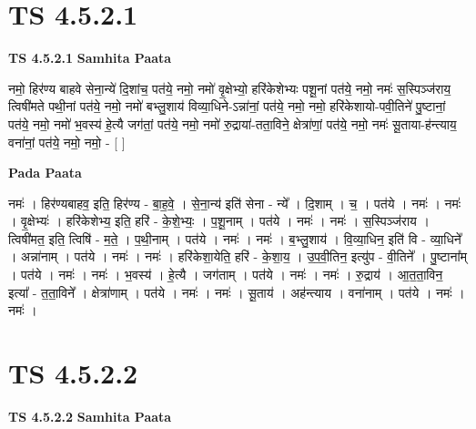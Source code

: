 \documentclass[17pt]{extarticle}
\begin{document}

\section{ TS 4.5.2.1 }

\textbf{TS 4.5.2.1 } \newline
\textbf{Samhita Paata} \newline

नमो॒ हिर॑ण्य बाहवे सेना॒न्ये॑ दि॒शांच॒ पत॑ये॒ नमो॒                        नमो॑ वृ॒क्षेभ्यो॒ हरि॑केशेभ्यः पशू॒नां पत॑ये॒ नमो॒                नमः॑ स॒स्पिञ्ज॑राय॒ त्विषी॑मते पथी॒नां पत॑ये॒ नमो॒                    नमो॑ बभ्लु॒शाय॑ विव्या॒धिने-ऽन्ना॑नां॒ पत॑ये॒ नमो॒                  नमो॒ हरि॑केशायो-पवी॒तिने॑ पु॒ष्टानां॒ पत॑ये॒ नमो॒                                 नमो॑ भ॒वस्य॑ हे॒त्यै जग॑तां॒ पत॑ये॒ नमो॒                                                नमो॑ रु॒द्राया॑-तता॒विने॒ क्षेत्रा॑णां॒ पत॑ये॒ नमो॒                          नमः॑ सू॒ताया-ह॑न्त्याय॒ वना॑नां॒ पत॑ये॒ नमो॒ नमो॒ - [  ] \newline

\textbf{Pada Paata} \newline

नमः॑ । हिर॑ण्यबाहव॒ इति॒ हिर॑ण्य - बा॒ह॒वे॒ । से॒ना॒न्य॑ इति॑ सेना - न्ये᳚ । दि॒शाम् । च॒ । पत॑ये । नमः॑ । नमः॑ । वृ॒क्षेभ्यः॑ । हरि॑केशेभ्य॒ इति॒ हरि॑ - के॒शे॒भ्यः॒ । प॒शू॒नाम् । पत॑ये । नमः॑ । नमः॑ । स॒स्पिञ्ज॑राय । त्विषी॑मत॒ इति॒ त्विषि॑ - म॒ते॒ । प॒थी॒नाम् । पत॑ये । नमः॑ । नमः॑ । ब॒भ्लु॒शाय॑ । वि॒व्या॒धिन॒ इति॑ वि - व्या॒धिने᳚ । अन्ना॑नाम् । पत॑ये । नमः॑ । नमः॑ । हरि॑केशा॒येति॒ हरि॑ - के॒शा॒य॒ । उ॒प॒वी॒तिन॒ इत्यु॑प - वी॒तिने᳚ । पु॒ष्टाना᳚म् । पत॑ये । नमः॑ । नमः॑ । भ॒वस्य॑ । हे॒त्यै । जग॑ताम् । पत॑ये । नमः॑ । नमः॑ । रु॒द्राय॑ । आ॒त॒ता॒विन॒ इत्या᳚ - त॒ता॒विने᳚ । क्षेत्रा॑णाम् । पत॑ये । नमः॑ । नमः॑ । सू॒ताय॑ । अह॑न्त्याय । वना॑नाम् । पत॑ये । नमः॑ । नमः॑ ।  \newline





\section{ TS 4.5.2.2 }

\textbf{TS 4.5.2.2 } \newline
\textbf{Samhita Paata} \newline
\end{document}
